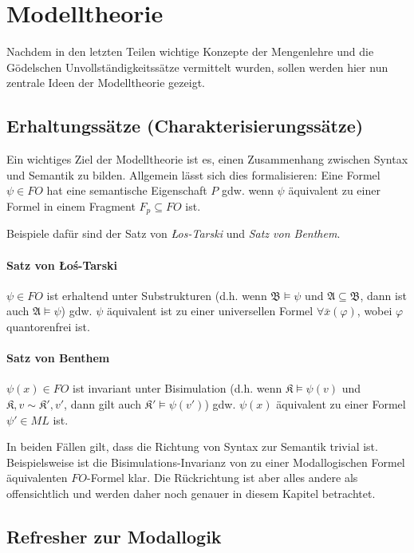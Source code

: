 \clearpage

\section{Modelltheorie}

Nachdem in den letzten Teilen wichtige Konzepte der Mengenlehre und die Gödelschen Unvollständigkeitssätze vermittelt wurden, sollen werden hier nun zentrale Ideen der Modelltheorie gezeigt.

\subsection{Erhaltungssätze (Charakterisierungssätze)}

Ein wichtiges Ziel der Modelltheorie ist es, einen Zusammenhang zwischen Syntax und Semantik zu bilden. Allgemein lässt sich dies formalisieren: Eine Formel $\psi\in FO$ hat eine semantische Eigenschaft $P$ gdw. wenn $\psi$ äquivalent zu einer Formel in einem Fragment $F_p\subseteq FO$ ist.

Beispiele dafür sind der Satz von \textit{\L os-Tarski} und \textit{Satz von Benthem}.

\paragraph{Satz von \L o\'{s}-Tarski}
$\psi\in FO$ ist erhaltend unter Substrukturen (d.h. wenn $\mathfrak{B}\models \psi$ und $\mathfrak{A}\subseteq\mathfrak{B}$, dann ist auch $\mathfrak{A}\models\psi$) gdw. $\psi$ äquivalent ist zu einer universellen Formel $\forall \bar{x}(\varphi)$, wobei $\varphi$ quantorenfrei ist.

\paragraph{Satz von Benthem}
$\psi(x)\in FO$ ist invariant unter Bisimulation (d.h. wenn $\mathfrak{K}\models \psi(v)$ und $\mathfrak{K},v\sim \mathfrak{K}',v'$, dann gilt auch $\mathfrak{K}'\models \psi(v')$) gdw. $\psi(x)$ äquivalent zu einer Formel $\psi'\in ML$ ist.

In beiden Fällen gilt, dass die Richtung von Syntax zur Semantik trivial ist. Beispielsweise ist die Bisimulations-Invarianz von zu einer Modallogischen Formel äquivalenten $FO$-Formel klar. Die Rückrichtung ist aber alles andere als offensichtlich und werden daher noch genauer in diesem Kapitel betrachtet.

\subsection*{Refresher zur Modallogik}

